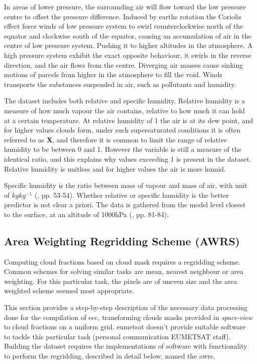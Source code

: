 In areas of lower pressure, the surrounding air will flow toward the low pressure centre to offset the pressure difference. Induced by earths rotation the Coriolis effect force winds of low pressure system to swirl counterclockwise north of the equator and clockwise south of the equator, causing an accumulation of air in the centre of low pressure system. Pushing it to higher altitudes in the atmosphere. A high pressure system exhibit the exact opposite behaviour, it swirls in the reverse direction, and the air flows from the centre. Diverging air masses cause sinking motions of parcels from higher in the atmosphere to fill the void. 
Winds transports the substances suspended in air, such as pollutants and humidity. 

The dataset includes both relative and specific humidity. Relative humidity is a measure of how much vapour the air contains, relative to how much it can hold at a certain temperature. At relative humidity of 1 the air is at its dew point, and for higher values clouds form, under such supersaturated conditions it is often referred to as \textbf{X}, and therefore it is common to limit the range of relative humidity to be between 0 and 1. However the variable is still a measure of the identical ratio, and this explains why values exceeding 1 is present in the dataset. Relative humidity is unitless and for higher values the air is more humid.

Specific humidity is the ratio between mass of vapour and mass of air, with unit of $kg kg^{-1}$ (\cite{lohmann2016}, pp. 53-54). Whether relative or specific humidity is the better predictor is not clear a priori. The data is gathered from the model level closest to the surface, at an altitude of 1000hPa (\cite{lohmann2016}, pp. 81-84). 

\subsection{Area Weighting Regridding Scheme (AWRS)} \label{sec:remapping}
Computing cloud fractions based on cloud mask requires a regridding scheme. Common schemes for solving similar tasks are mean, nearest neighbour or area weighting. For this particular task, the pixels are of uneven size and the area weighted scheme seemed most appropriate. 

This section provides a step-by-step description of the necessary data processing done for the compilation of \acrshort{ecc}, transforming clouds masks provided in \textit{space-view} to cloud fractions on a uniform grid. \acrshort{eumetsat} doesn't provide suitable software to tackle this particular task (personal communication EUMETSAT staff). Building the dataset requires the implementations of software with functionality to perform the regridding, described in detail below, named the \acrfull{awrs}.

